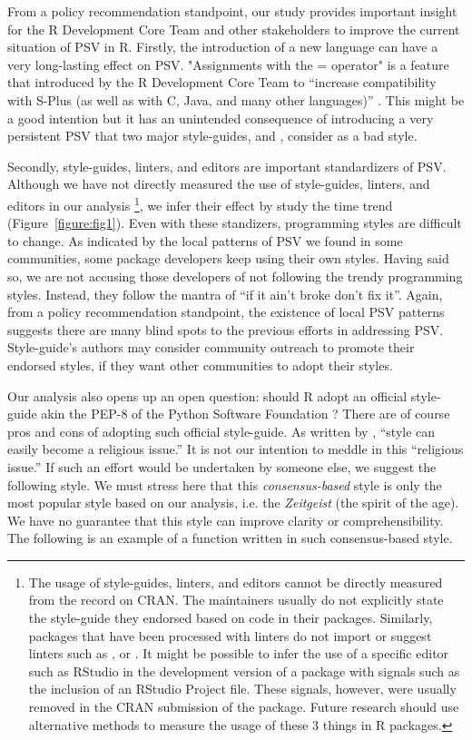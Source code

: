 From a policy recommendation standpoint, our study provides important insight for the R Development Core Team and other stakeholders to improve the current situation of PSV in R. Firstly, the introduction of a new language can have a very long-lasting effect on PSV. "Assignments with the = operator" is a feature that introduced by the R Development Core Team to ``increase compatibility with S-Plus (as well as with C, Java, and many other languages)'' \citep{chambers}. This might be a good intention but it has an unintended consequence of introducing a very persistent PSV that two major style-guides, \citet{tidyverse} and \citet{google}, consider as a bad style.

Secondly, style-guides, linters, and editors are important standardizers of PSV. Although we have not directly measured the use of style-guides, linters, and editors in our analysis \footnote{The usage of style-guides, linters, and editors cannot be directly measured from the record on CRAN. The maintainers usually do not explicitly state the style-guide they endorsed based on code in their packages. Similarly, packages that have been processed with linters do not import or suggest linters such as ,  or . It might be possible to infer the use of a specific editor such as RStudio in the development version of a package with signals such as the inclusion of an RStudio Project file. These signals, however, were usually removed in the CRAN submission of the package. Future research should use alternative methods to measure the usage of these 3 things in R packages.}, we infer their effect by study the time trend (Figure~\ref{figure:fig1}). Even with these standizers, programming styles are difficult to change. As indicated by the local patterns of PSV we found in some communities, some package developers keep using their own styles. Having said so, we are not accusing those developers of not following the trendy programming styles. Instead, they follow the mantra of ``if it ain't broke don't fix it''. Again, from a policy recommendation standpoint, the existence of local PSV patterns suggests there are many blind spots to the previous efforts in addressing PSV. Style-guide's authors may consider community outreach to promote their endorsed styles, if they want other communities to adopt their styles.

Our analysis also opens up an open question: should R adopt an official style-guide akin the PEP-8 of the Python Software Foundation \citep{vanrossum}? There are of course pros and cons of adopting such official style-guide. As written by \citet{christiansen}, ``style can easily become a religious issue.'' It is not our intention to meddle in this ``religious issue.'' If such an effort would be undertaken by someone else, we suggest the following style. We must stress here that this \emph{consensus-based} style is only the most popular style based on our analysis, i.e. the \emph{Zeitgeist} (the spirit of the age). We have no guarantee that this style can improve clarity or comprehensibility. The following is an example of a function written in such consensus-based style.

